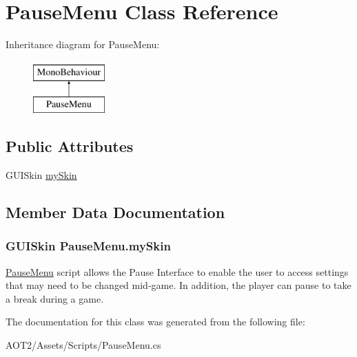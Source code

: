 \hypertarget{class_pause_menu}{}\section{Pause\+Menu Class Reference}
\label{class_pause_menu}
Inheritance diagram for Pause\+Menu\+:\begin{figure}[H]
\begin{center}
\leavevmode
\includegraphics[height=2.000000cm]{class_pause_menu}
\end{center}
\end{figure}
\subsection*{Public Attributes}
\begin{DoxyCompactItemize}
\item 
G\+U\+I\+Skin \hyperlink{class_pause_menu_af78d9844a86f8ffb0ebf4d711fe0c2ce}{my\+Skin}
\end{DoxyCompactItemize}


\subsection{Member Data Documentation}
\hypertarget{class_pause_menu_af78d9844a86f8ffb0ebf4d711fe0c2ce}{}
\subsubsection[{my\+Skin}]{\setlength{\rightskip}{0pt plus 5cm}G\+U\+I\+Skin Pause\+Menu.\+my\+Skin}\label{class_pause_menu_af78d9844a86f8ffb0ebf4d711fe0c2ce}
\hyperlink{class_pause_menu}{Pause\+Menu} script allows the Pause Interface to enable the user to access settings that may need to be changed mid-\/game. In addition, the player can pause to take a break during a game. 

The documentation for this class was generated from the following file\+:\begin{DoxyCompactItemize}
\item 
A\+O\+T2/\+Assets/\+Scripts/Pause\+Menu.\+cs\end{DoxyCompactItemize}
